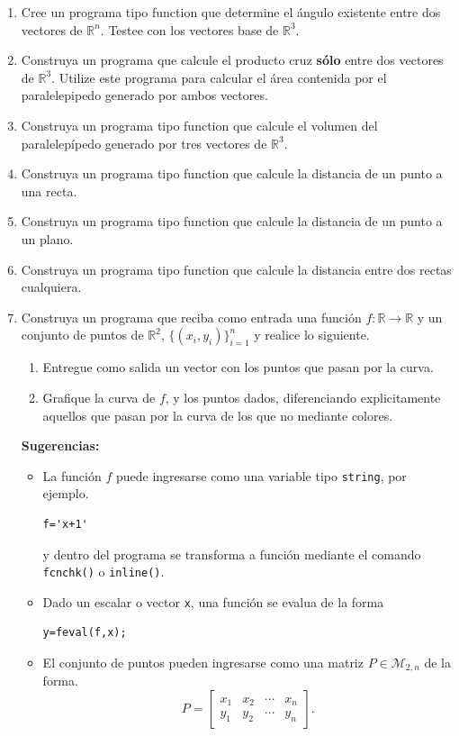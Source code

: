 \documentclass[letter,11pt]{article}
\newcommand\0{\mathbf{0}}
\begin{document}
\begin{enumerate}
\item Cree un programa tipo function que determine el \'angulo existente entre dos vectores de $\mathbb{R}^{n}$. Testee con los vectores base de $\mathbb{R}^3$.
								
\item Construya un programa que calcule el producto cruz \textbf{s\'olo} entre dos vectores de $\mathbb{R}^3$. Utilize este programa para calcular el \'area contenida por el paralelepipedo generado por ambos vectores.

\item Construya un programa tipo function que calcule el volumen del paralelep\'ipedo generado por tres vectores de $\mathbb{R}^3$.

\item Construya un programa tipo function que calcule la distancia de un punto a una recta.

\item Construya un programa tipo function que calcule la distancia de un punto a un plano.

\item Construya un programa tipo function que calcule la distancia entre dos rectas cualquiera.

\item Construya un programa que reciba como entrada una funci\'on $f: \mathbb{R}\to\mathbb{R}$ y un conjunto de puntos de $\mathbb{R}^2$, $\{(x_i,y_i)\}_{i=1}^n$ y realice lo siguiente.
\begin{enumerate}
\item Entregue como salida un vector con los puntos que pasan por la curva.
\item Grafique la curva de $f$, y los puntos dados, diferenciando explicitamente aquellos que pasan por la curva de los que no mediante colores.
\end{enumerate}
\textbf{Sugerencias:}
\begin{itemize}
\item La funci\'on $f$ puede ingresarse como una variable tipo \texttt{string}, por ejemplo.
\begin{lstlisting}
f='x+1'
\end{lstlisting}
y dentro del programa se transforma a funci\'on mediante el comando \texttt{fcnchk()} o \texttt{inline()}. 
\item Dado un escalar o vector \texttt{x}, una funci\'on se evalua de la forma
\begin{lstlisting}
y=feval(f,x);
\end{lstlisting}
\item El conjunto de puntos pueden ingresarse como una matriz $P\in \mathcal{M}_{2,n}$ de la forma.
$$P=\begin{bmatrix}
x_1 & x_2 & \cdots & x_n \\
y_1 & y_2 & \cdots & y_n 
\end{bmatrix}.
$$
\end{itemize}


\end{enumerate}
\end{document}
